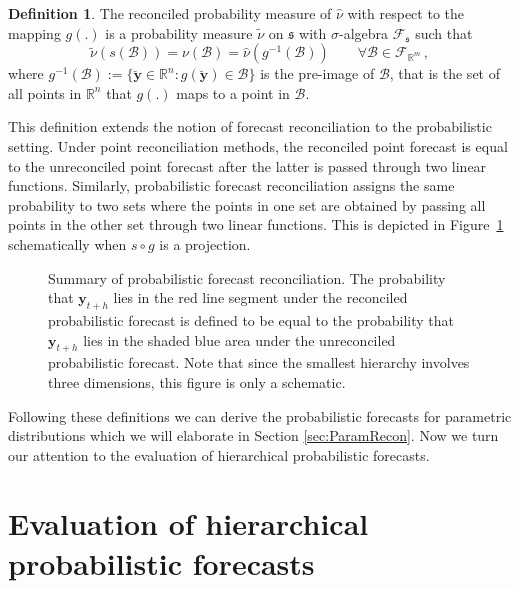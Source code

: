 \documentclass[12pt]{article}
\theoremstyle{definition}
\newtheorem{definition}{Definition}[section]
\begin{document}
\begin{definition} \label{def:reconprob}
  The reconciled probability measure of $\hat{\nu}$ with respect to the mapping $g(.)$ is a probability measure $\tilde{\nu}$ on $\mathfrak{s}$ with $\sigma$-algebra $\mathscr{F}_\mathfrak{s}$ such that
  \begin{equation}
  \tilde{\nu}(s(\mathcal{B})) = \nu(\mathcal{B})= \hat{\nu}(g^{-1}(\mathcal{B})) \qquad \forall \mathcal{B} \in \mathscr{F}_{\mathbb{R}^m}\,,
  \end{equation}
  where $g^{-1}(\mathcal{B}):=\{\breve{\bm{y}}\in \mathbb{R}^n:g(\breve{\bm{y}})\in \mathcal{B}\}$ is the pre-image of $\mathcal{B}$, that is the set of all points in $\mathbb{R}^n$ that $g(.)$ maps to a point in $\mathcal{B}$.
\end{definition}

This definition extends the notion of forecast reconciliation to the probabilistic setting. Under point reconciliation methods, the reconciled point forecast is equal to the unreconciled point forecast after the latter is passed through two linear functions. Similarly, probabilistic forecast reconciliation assigns the same probability to two sets where the points in one set are obtained by passing all points in the other set through two linear functions. This is depicted in Figure~\ref{fig:probfr_sch} schematically when $s\circ g$ is a projection.

\begin{figure}
	
	\caption{Summary of probabilistic forecast reconciliation. The probability that $\bm{y}_{t+h}$ lies in the red line segment under the reconciled probabilistic forecast is defined to be equal to the probability that $\bm{y}_{t+h}$ lies in the shaded blue area under the unreconciled probabilistic forecast. Note that since the smallest hierarchy involves three dimensions, this figure is only a schematic.}\label{fig:probfr_sch}
\end{figure}

Following these definitions we can derive the probabilistic forecasts for parametric distributions which we will elaborate in Section \ref{sec:ParamRecon}. Now we turn our attention to the evaluation of hierarchical probabilistic forecasts.  


\section{Evaluation of hierarchical probabilistic forecasts}\label{sec:evaluation}
\end{document}
